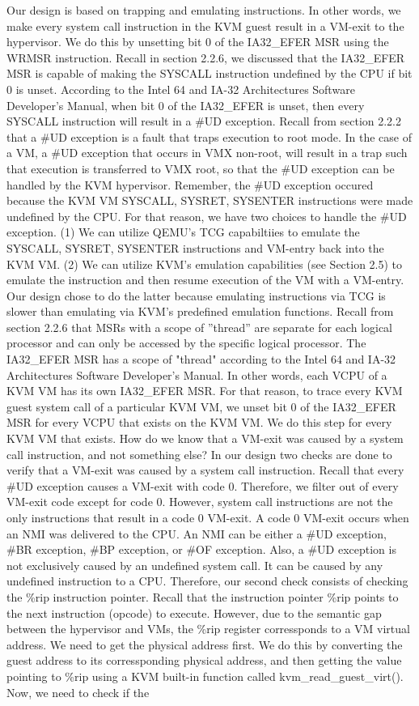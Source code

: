 \documentclass{report}
\begin{document}
\begin{spacing}{1.5}
{\large
Our design is based on trapping and emulating instructions. In other words, we make every system call instruction in the KVM guest result in a VM-exit to the hypervisor. We do this by unsetting bit 0 of the IA32\_EFER MSR using the WRMSR instruction. Recall in section 2.2.6, we discussed that the IA32\_EFER MSR is capable of making the SYSCALL instruction undefined by the CPU if bit 0 is unset. According to the Intel 64 and IA-32 Architectures Software Developer’s Manual, when bit 0 of the IA32\_EFER is unset, then every SYSCALL instruction will result in a \#UD exception. Recall from section 2.2.2 that a \#UD exception is a fault that traps execution to root mode. In the case of a VM, a \#UD exception that occurs in VMX non-root, will result in a trap such that execution is transferred to VMX root, so that the \#UD exception can be handled by the KVM hypervisor. Remember, the \#UD exception occured because the KVM VM SYSCALL, SYSRET, SYSENTER instructions were made undefined by the CPU. For that reason, we have two choices to handle the \#UD exception. (1) We can utilize QEMU's TCG capabiltiies to emulate the SYSCALL, SYSRET, SYSENTER instructions and VM-entry back into the KVM VM. (2) We can utilize KVM's emulation capabilities (see Section 2.5) to emulate the instruction and then resume execution of the VM with a VM-entry. Our design chose to do the latter because emulating instructions via TCG is slower than emulating via KVM's predefined emulation functions. Recall from section 2.2.6 that MSRs with a scope of ”thread” are separate for each logical processor and can only be accessed by the specific logical processor. The IA32\_EFER MSR has a scope of "thread" according to the Intel 64 and IA-32 Architectures Software Developer’s Manual. In other words, each VCPU of a KVM VM has its own IA32\_EFER MSR. For that reason, to trace every KVM guest system call of a particular KVM VM, we unset bit 0 of the IA32\_EFER MSR for every VCPU that exists on the KVM VM. We do this step for every KVM VM that exists. How do we know that a VM-exit was caused by a system call instruction, and not something else? In our design two checks are done to verify that a VM-exit was caused by a system call instruction. Recall that every \#UD exception causes a VM-exit with code 0. Therefore, we filter out of every VM-exit code except for code 0. However, system call instructions are not the only instructions that result in a code 0 VM-exit. A code 0 VM-exit occurs when an NMI was delivered to the CPU. An NMI can be either a \#UD exception, \#BR exception, \#BP exception, or \#OF exception. Also, a \#UD exception is not exclusively caused by an undefined system call. It can be caused by any undefined instruction to a CPU. Therefore, our second check consists of checking the \%rip instruction pointer. Recall that the instruction pointer \%rip points to the next instruction (opcode) to execute. However, due to the semantic gap between the hypervisor and VMs, the \%rip register corressponds to a VM virtual address. We need to get the physical address first. We do this by converting the guest address to its corressponding physical address, and then getting the value pointing to \%rip using a KVM built-in function called kvm\_read\_guest\_virt(). Now, we need to check if the }
\end{spacing}
\end{document}
